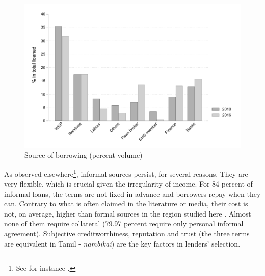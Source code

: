 \documentclass[a4paper, 11pt, onecolumn]{article}
\begin{document}
\begin{figure}[ht]
\center
\includegraphics[width=12cm]{totalloaned.pdf}
\caption{Source of borrowing (percent volume)}
\label{bar:loaned}
\end{figure}

As observed elsewhere\footnote{See for instance \cite{Morvant2013, Collins2009, Shipton2007, James2015, Saiag2020, Guerin2013}.}, informal sources persist, for several reasons. 
They are very flexible, which is crucial given the irregularity of income. 
For 84 percent of informal loans, the terms are not fixed in advance and borrowers repay when they can. Contrary to what is often claimed in the literature or media, their cost is not, on average, higher than formal sources in the region studied here \citep{Reboul2019}. 
Almost none of them require collateral (79.97 percent require only personal informal agreement). 
Subjective creditworthiness, reputation and trust (the three terms are equivalent in Tamil - \textit{nambikai}) are the key factors in lenders' selection. 
\end{document}
